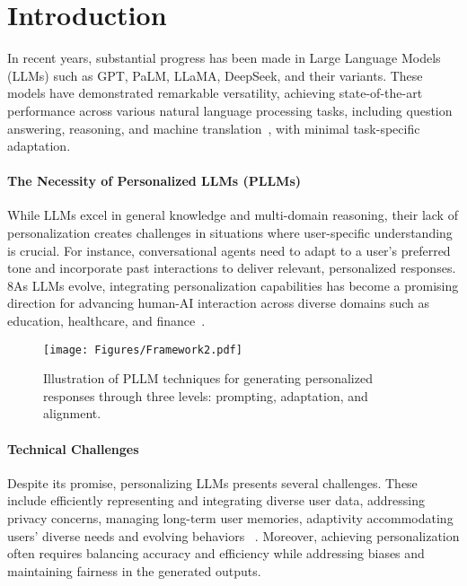 \section{Introduction}

In recent years, substantial progress has been made in Large Language Models (LLMs) such as GPT, PaLM, LLaMA, DeepSeek, and their variants. These models have demonstrated remarkable versatility, achieving state-of-the-art performance across various natural language processing tasks, including question answering, reasoning, and machine translation~\citep{zhao2023survey}, with minimal task-specific adaptation.

\paragraph{The Necessity of Personalized LLMs (PLLMs)} While LLMs excel in general knowledge and multi-domain reasoning, their lack of personalization creates challenges in situations where user-specific understanding is crucial. For instance, conversational agents need to adapt to a user's preferred tone and incorporate past interactions to deliver relevant, personalized responses. 
8As LLMs evolve, integrating personalization capabilities has become a promising direction for advancing human-AI interaction across diverse domains such as education, healthcare, and finance~\citep{hu-etal-2024-serts,zhang2024memsim,zhang2024survey, zhu2024lifelong,wang2023large,wang2024tpe}.

\begin{figure}[!t]
    \centering
    \texttt{[image: Figures/Framework2.pdf]}
    \caption{Illustration of PLLM techniques for generating personalized responses through three levels: prompting, adaptation, and alignment.}
    \label{fig:framework}
\vspace{-10pt}
\end{figure}

\paragraph{Technical Challenges} Despite its promise, personalizing LLMs presents several challenges. These include efficiently representing and integrating diverse user data, addressing privacy concerns, managing long-term user memories, 
adaptivity accommodating users' diverse needs and evolving behaviors
~\citep{salemi2023lamp}. 
Moreover, achieving personalization often requires balancing accuracy and efficiency while addressing biases and maintaining fairness in the generated outputs.

